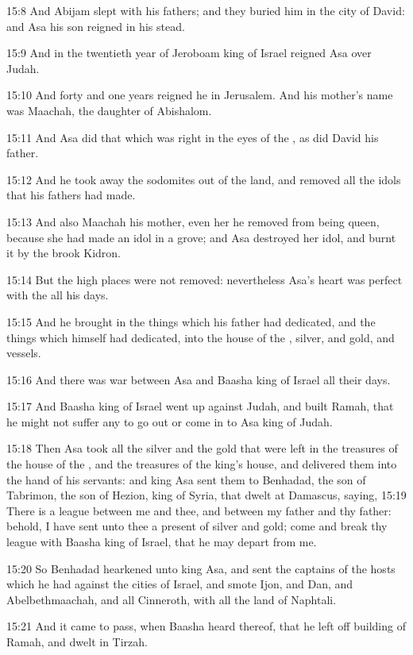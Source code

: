 15:8 And Abijam slept with his fathers; and they buried him in the city of David: and Asa his son reigned in his stead.

15:9 And in the twentieth year of Jeroboam king of Israel reigned Asa over Judah.

15:10 And forty and one years reigned he in Jerusalem. And his mother's name was Maachah, the daughter of Abishalom.

15:11 And Asa did that which was right in the eyes of the \LORD, as did David his father.

15:12 And he took away the sodomites out of the land, and removed all the idols that his fathers had made.

15:13 And also Maachah his mother, even her he removed from being queen, because she had made an idol in a grove; and Asa destroyed her idol, and burnt it by the brook Kidron.

15:14 But the high places were not removed: nevertheless Asa's heart was perfect with the \LORD all his days.

15:15 And he brought in the things which his father had dedicated, and the things which himself had dedicated, into the house of the \LORD, silver, and gold, and vessels.

15:16 And there was war between Asa and Baasha king of Israel all their days.

15:17 And Baasha king of Israel went up against Judah, and built Ramah, that he might not suffer any to go out or come in to Asa king of Judah.

15:18 Then Asa took all the silver and the gold that were left in the treasures of the house of the \LORD, and the treasures of the king's house, and delivered them into the hand of his servants: and king Asa sent them to Benhadad, the son of Tabrimon, the son of Hezion, king of Syria, that dwelt at Damascus, saying, 15:19 There is a league between me and thee, and between my father and thy father: behold, I have sent unto thee a present of silver and gold; come and break thy league with Baasha king of Israel, that he may depart from me.

15:20 So Benhadad hearkened unto king Asa, and sent the captains of the hosts which he had against the cities of Israel, and smote Ijon, and Dan, and Abelbethmaachah, and all Cinneroth, with all the land of Naphtali.

15:21 And it came to pass, when Baasha heard thereof, that he left off building of Ramah, and dwelt in Tirzah.

